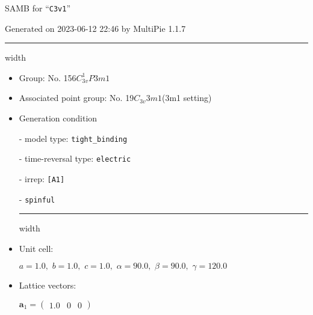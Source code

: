 \documentclass[fleqn,10pt,landscape]{article}
\begin{document}
\setcounter{MaxMatrixCols}{16}

\setlength{\baselineskip}{16pt}
\footnotesize
\begin{center}
\LARGE
SAMB for ``\texttt{C3v1}''
\end{center}
\begin{flushright}
Generated on 2023-06-12 22:46 by MultiPie 1.1.7
\end{flushright}
\vspace{1cm}


 \hfil \hrule height 1mm width \textwidth \hfil

\begin{itemize}
\item Group: No. 156\quad$C_{3v}^{1}$\quad$P3m1$\quad[ trigonal ]

\item Associated point group: No. 19\quad$C_{3v}$\quad$3m1$\quad(3m1 setting)\quad[ trigonal ]

\vspace{5mm}

\item Generation condition

\quad - model type: \texttt{tight_binding}

\quad - time-reversal type: \texttt{electric}

\quad - irrep: \texttt{[A1]}

\quad - \texttt{spinful}


 \hfil \hrule height 1mm width \textwidth \hfil

\item Unit cell:

\quad $a=1.0,\,\, b=1.0,\,\, c=1.0,\,\, \alpha=90.0,\,\, \beta=90.0,\,\, \gamma=120.0$

\item Lattice vectors:

\quad $\bm{a}_1=\begin{pmatrix} 1.0 & 0 & 0 \end{pmatrix}$


\end{itemize}
\end{document}

